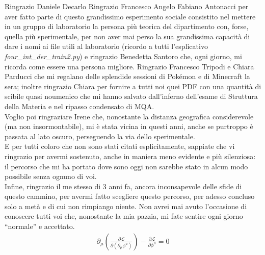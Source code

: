 Ringrazio Daniele Decarlo Ringrazio Francesco Angelo Fabiano Antonacci per aver fatto parte di questo grandissimo esperimento sociale consistito nel mettere in un gruppo di laboratorio la persona più teorica del dipartimento con, forse, quella più sperimentale, per non aver mai perso la sua grandissima capacità di dare i nomi ai file utili al laboratorio (ricordo a tutti l'esplicativo \emph{four\_int\_der\_train2.py}) e ringrazio Benedetta Santoro che, ogni giorno, mi ricorda come essere una persona migliore. Ringrazio Francesco Tripodi e Chiara Parducci che mi regalano delle splendide sessioni di Pokémon e di Minecraft la sera; inoltre ringrazio Chiara per fornire a tutti noi quei PDF con una quantità di scibile quasi noumenico che mi hanno salvato dall'inferno dell'esame di Struttura della Materia e nel ripasso condensato di MQA.\\
Voglio poi ringraziare Irene che, nonostante la distanza geografica considerevole (ma non insormontabile), mi è stata vicina in questi anni, anche se purtroppo è passata al lato oscuro, perseguendo la via dello sperimentale. \\
E per tutti coloro che non sono stati citati esplicitamente, sappiate che vi ringrazio per avermi sostenuto, anche in maniera meno evidente e più silenziosa: il percorso che mi ha portato dove sono oggi non sarebbe stato in alcun modo possibile senza ognuno di voi. \\
Infine, ringrazio il me stesso di 3 anni fa, ancora inconsapevole delle sfide di questo cammino, per avermi fatto scegliere questo percorso, per adesso concluso solo a metà e di cui non rimpiango niente. Non avrei mai avuto l'occasione di conoscere tutti voi che, nonostante la mia pazzia, mi fate sentire ogni giorno ``normale'' e accettato.
\begin{align*}
	\partial_\mu\left( \frac{\partial \mathscr{L}}{\partial( \partial_\mu \phi^a)} \right) - \frac{\partial \mathscr{L}}{\partial \phi^a} = 0
\end{align*}
